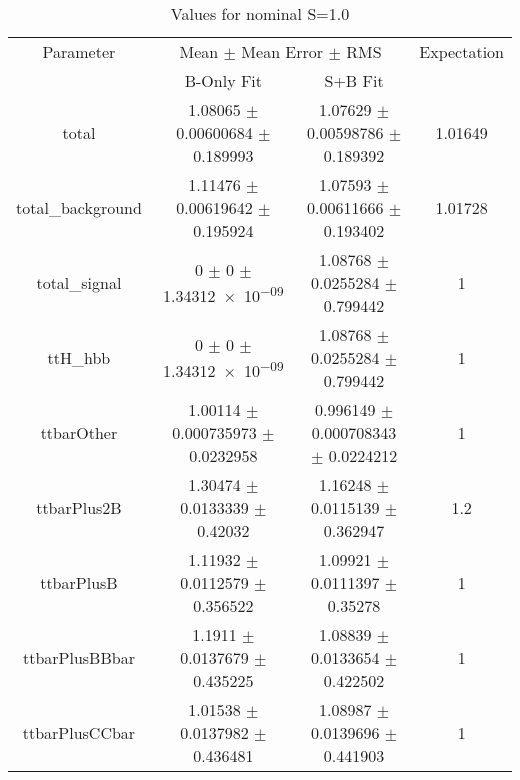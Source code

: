 \begin{table}
\centering
\caption{Values for nominal S=1.0}
\begin{tabular}{cccc}
\toprule
Parameter & \multicolumn{2}{c}{Mean $\pm$ Mean Error $\pm$ RMS} & Expectation\\
 & B-Only Fit & S+B Fit & \\
\midrule
total & \num{1.08065} $\pm$ \num{0.00600684} $\pm$ \num{0.189993} & \num{1.07629} $\pm$ \num{0.00598786} $\pm$ \num{0.189392} & \num{1.01649}\\
total\_background & \num{1.11476} $\pm$ \num{0.00619642} $\pm$ \num{0.195924} & \num{1.07593} $\pm$ \num{0.00611666} $\pm$ \num{0.193402} & \num{1.01728}\\
total\_signal & \num{0} $\pm$ \num{0} $\pm$ \num{1.34312e-09} & \num{1.08768} $\pm$ \num{0.0255284} $\pm$ \num{0.799442} & \num{1}\\
ttH\_hbb & \num{0} $\pm$ \num{0} $\pm$ \num{1.34312e-09} & \num{1.08768} $\pm$ \num{0.0255284} $\pm$ \num{0.799442} & \num{1}\\
ttbarOther & \num{1.00114} $\pm$ \num{0.000735973} $\pm$ \num{0.0232958} & \num{0.996149} $\pm$ \num{0.000708343} $\pm$ \num{0.0224212} & \num{1}\\
ttbarPlus2B & \num{1.30474} $\pm$ \num{0.0133339} $\pm$ \num{0.42032} & \num{1.16248} $\pm$ \num{0.0115139} $\pm$ \num{0.362947} & \num{1.2}\\
ttbarPlusB & \num{1.11932} $\pm$ \num{0.0112579} $\pm$ \num{0.356522} & \num{1.09921} $\pm$ \num{0.0111397} $\pm$ \num{0.35278} & \num{1}\\
ttbarPlusBBbar & \num{1.1911} $\pm$ \num{0.0137679} $\pm$ \num{0.435225} & \num{1.08839} $\pm$ \num{0.0133654} $\pm$ \num{0.422502} & \num{1}\\
ttbarPlusCCbar & \num{1.01538} $\pm$ \num{0.0137982} $\pm$ \num{0.436481} & \num{1.08987} $\pm$ \num{0.0139696} $\pm$ \num{0.441903} & \num{1}\\
\bottomrule
\end{tabular}
\end{table}